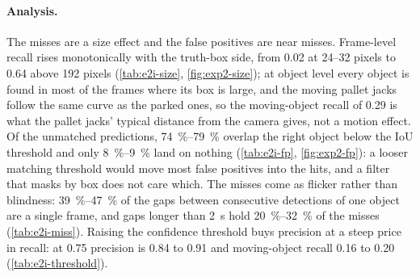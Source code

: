 \documentclass[11pt,a4paper,notitlepage]{report}
\begin{document}
\begin{table}[htbp]
\centering
\caption[Detector scores per recording and pooled.]{Detector scores per
recording and pooled, four-class checkpoint,
confidence 0.35, matching IoU 0.5. ``Truth'' counts every projected box and
``exempt'' those under 12 pixels or more than \SI{70}{\percent} covered;
$R_{\mathrm{scored}}$ is recall over the rest, $R_{\mathrm{all}}$ over every
box, $R_{\mathrm{mov}}$ over the moving truth boxes.}
\label{tab:exp2-summary}
\small
{}
\end{table}

\paragraph{Analysis.} The misses are a size effect and the false positives
are near misses. Frame-level recall rises monotonically with the truth-box
side, from 0.02 at 24--32 pixels to 0.64 above 192 pixels
(\cref{tab:e2i-size}, \cref{fig:exp2-size}); at object level every object is
found in most of the frames where its box is large, and the moving pallet
jacks follow the same curve as the parked ones, so the moving-object recall
of 0.29 is what the pallet jacks' typical distance from the camera gives,
not a motion effect. Of the unmatched predictions, \SIrange{74}{79}{\percent}
overlap the right object below the IoU threshold and only
\SIrange{8}{9}{\percent} land on nothing (\cref{tab:e2i-fp},
\cref{fig:exp2-fp}): a looser matching threshold would move most false
positives into the hits, and a filter that masks by box does not care which.
The misses come as flicker rather than blindness: \SIrange{39}{47}{\percent}
of the gaps between consecutive detections of one object are a single frame,
and gaps longer than \SI{2}{\second} hold \SIrange{20}{32}{\percent} of the
misses (\cref{tab:e2i-miss}). Raising the confidence threshold buys
precision at a steep price in recall: at 0.75 precision is 0.84 to 0.91 and
moving-object recall 0.16 to 0.20 (\cref{tab:e2i-threshold}).
\end{document}
